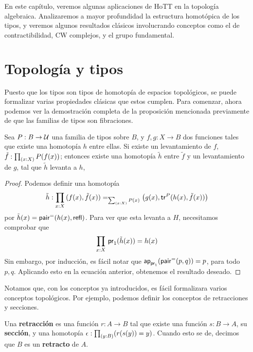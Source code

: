 \documentclass[../main.tex]{subfiles}
\begin{document}
En este cap\'itulo, veremos algunas aplicaciones de HoTT en la topolog\'ia algebraica.
Analizaremos a mayor profundidad la estructura homot\'opica de los tipos,
y veremos algunos resultados cl\'asicos involucrando conceptos como el de contractibilidad, CW complejos, y el grupo fundamental.

\section{Topolog\'ia y tipos}

Puesto que los tipos son tipos de homotop\'ia de espacios topol\'ogicos, se puede formalizar varias propiedades cl\'asicas que estos cumplen.
Para comenzar, ahora podemos ver la demostraci\'on completa de la proposici\'on mencionada previamente de que las familias de tipos son fibraciones.

\begin{proposition}\label{sigmafib}
  Sea $P : B \to \mathcal{U}$ una familia de tipos sobre $B$, y $f,g: X \to B$ dos funciones tales que existe una homotop\'ia $h$ entre ellas. Si existe un levantamiento de $f$, $\tilde f:\prd{x:X}P(f(x))$; entonces existe una homotop\'ia $\tilde h$ entre $\tilde f$ y un levantamiento de $g$, tal que $\tilde h$ levanta a $h$,
\end{proposition}
\begin{proof}
  Podemos definir una homotop\'ia
  \[ \tilde h : \prd{x:X} \id[\tsm{x:X}P(x)]{(f(x),\tilde f(x))}{\left(g(x), \trfib{P}{h(x)}{\tilde f(x)}\right)} \]
  por $\tilde h(x)=\mathsf{pair}^=(h(x), \mathsf{refl})$. Para ver que esta levanta a $H$, necesitamos comprobar que
  \[ \prd{x:X}\fst(\tilde h(x))=h(x) \]
  Sin embargo, por inducci\'on, es f\'acil notar que $\mathsf{ap}_{\mathsf{pr}_{1}} (\mathsf{pair}^=(p , q)) = p$, para todo $p,q$. Aplicando esto en la ecuación anterior, obtenemos el resultado deseado.
\end{proof}

Notamos que, con los conceptos ya introducidos, es f\'acil formalizara varios conceptos topol\'ogicos. Por ejemplo, podemos definir los conceptos de retracciones y secciones.

\begin{definition}
  Una \textbf{retracci\'on} es una funci\'on $r:A \to B$ tal que existe una función $s:B \to A$, su \textbf{secci\'on}, y una homotop\'ia $\epsilon : \prd{y:B}(r(s(y))=y)$. Cuando esto se de, decimos que $B$ es un \textbf{retracto} de $A$.
\end{definition}
\end{document}

